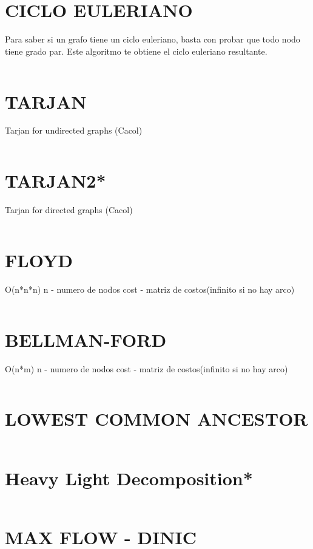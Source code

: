 \documentclass{article}
\begin{document}
\section*{CICLO EULERIANO}
Para saber si un grafo tiene un ciclo euleriano, basta con probar
que todo nodo tiene grado par.
Este algoritmo te obtiene el ciclo euleriano resultante.
\inputminted[]{c++}{algorithms/EULERIANCYCLE.cpp}
\newpage

\section*{TARJAN}
Tarjan for undirected graphs (Cacol)
\inputminted[]{c++}{algorithms/TARJAN.cpp}
\newpage

\section*{TARJAN2*}
Tarjan for directed graphs (Cacol)
\inputminted[]{c++}{algorithms/TARJAN2.cpp}
\newpage


\section*{FLOYD}
O(n*n*n)
n - numero de nodos
cost - matriz de costos(infinito si no hay arco)
\inputminted[]{c++}{algorithms/FLOYD.cpp}

\section*{BELLMAN-FORD}
O(n*m)
n - numero de nodos
cost - matriz de costos(infinito si no hay arco)
\inputminted[]{c++}{algorithms/BELLMAN.cpp}
\newpage

\section*{LOWEST COMMON ANCESTOR}
\inputminted[]{c++}{algorithms/LCA.cpp}
\newpage

\section*{Heavy Light Decomposition*}
\inputminted[]{c++}{algorithms/HeavyLight.cpp}
\newpage


\section*{MAX FLOW - DINIC}
\inputminted[]{c++}{algorithms/DINIC.cpp}
\newpage
\end{document}
